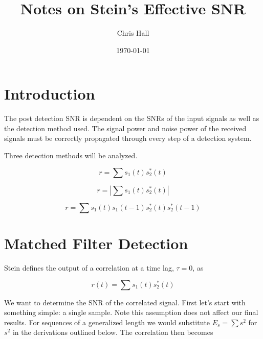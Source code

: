 \documentclass[11pt]{article}
\title{ Notes on Stein's Effective SNR}
\author{ Chris Hall }
\date{\today}
\begin{document}
\maketitle  





\section{Introduction}

The post detection SNR is dependent on the SNRs of the input signals as well as the detection method used.
The signal power and noise power of the received signals must be correctly propagated through every step of a detection system.

Three detection methods will be analyzed.

\begin{equation}
r = \sum s_1(t) s_2^*(t)
\end{equation}

\begin{equation}
r = |\sum s_1(t) s_2^*(t)|
\end{equation}

\begin{equation}
r = \sum s_1(t)s_1(t-1) s_2^*(t) s_2^*(t-1)
\end{equation}

\section{Matched Filter Detection}

Stein defines the output of a correlation at a time lag, $\tau=0$, as

\begin{equation}
r(t) = \sum s_1(t)s^{*}_2(t)
\end{equation}


We want to determine the SNR of the correlated signal. First let's start with something simple: a single sample. Note this assumption does not affect our final results. For sequences of a generalized length we would substitute $E_s = \sum s^2$ for $s^2$ in the derivations outlined below. The correlation then becomes
\end{document}
